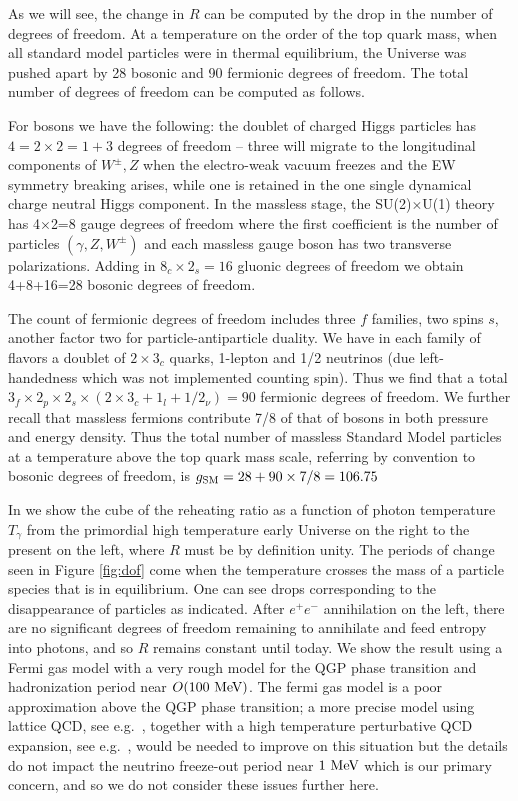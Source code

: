 As we will see, the change in $R$ can be computed by the drop in the number of degrees of freedom. At a temperature on the order of the top quark mass, when all standard model particles were in thermal equilibrium, the Universe was pushed apart by 28 bosonic and 90 fermionic degrees of freedom. The total number of degrees of freedom can be computed as follows. 

For bosons we have the following: the doublet of charged Higgs particles has $4=2\times2=1+3$ degrees of freedom -- three will migrate to the longitudinal components of $W^\pm, Z$ when the electro-weak vacuum freezes and the EW symmetry breaking arises, while one is retained in the one single dynamical charge neutral Higgs component. In the massless stage, the SU(2)$\times$U(1) theory has 4$\times$2=8 gauge degrees of freedom where the first coefficient is the number of particles $(\gamma, Z, W^\pm)$ and each massless gauge boson has two transverse polarizations. Adding in $8_c\times2_s=16$ gluonic degrees of freedom we obtain 4+8+16=28 bosonic degrees of freedom. 

The count of fermionic degrees of freedom includes three $f$ families, two spins $s$, another factor two for particle-antiparticle duality. We have in each family of flavors a doublet of $2\times 3_c$ quarks, 1-lepton and 1/2 neutrinos (due left-handedness which was not implemented counting spin). Thus we find that a total $3_f\times 2_p\times 2_s\times(2\times 3_c+1_l+1/2_\nu)=90$ fermionic degrees of freedom. We further recall that massless fermions contribute 7/8 of that of bosons in both pressure and energy density. Thus the total number of massless Standard Model particles at a temperature above the top quark mass scale, referring by convention to bosonic degrees of freedom, is $g_{\rm SM}=28+90\times 7/8=106.75$ 



In  we show the cube of the reheating ratio  as a function of photon temperature $T_\gamma$ from the primordial high temperature early Universe on the right to the present on the left, where $R$ must be by definition unity. The periods of change seen in Figure \ref{fig:dof} come when the temperature crosses the mass of a particle species that is in equilibrium. One can see drops corresponding to the disappearance of particles as indicated. After $e^+e^-$ annihilation on the left, there are no significant degrees of freedom remaining to annihilate and feed entropy into photons, and so $R$ remains constant until today. We show the result using a Fermi gas model with a very rough model for the QGP phase transition and hadronization period near $O(100\text{ MeV})$. The fermi gas model is a poor approximation above the QGP phase transition; a more precise model using lattice QCD, see e.g.~\cite{Borsanyi:2013bia}, together with a high temperature perturbative QCD expansion, see e.g.~\cite{Letessier:2002ony}, would be needed to improve on this situation but the details do not impact the neutrino freeze-out period near $1\text{ MeV}$ which is our primary concern, and so we do not consider these issues further here.


